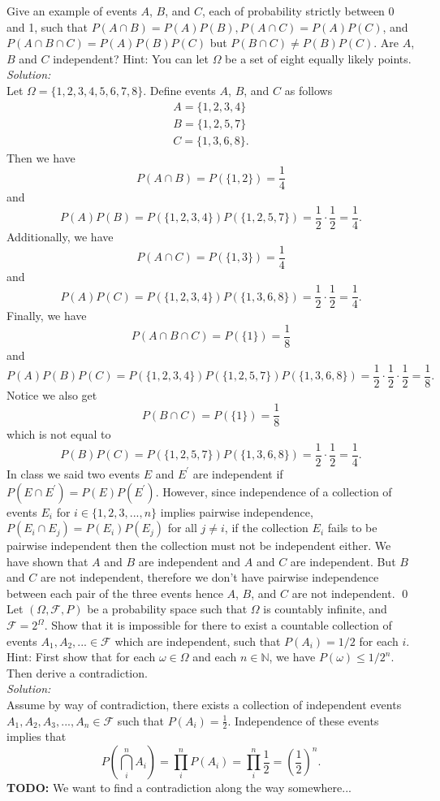 \documentclass[10pt]{amsart}
\begin{document}
 Give an example of events $A$, $B$, and $C$, each of probability strictly between 0 and 1, such that
$P(A\cap B)=P(A)P(B), P(A\cap C)=P(A)P(C)$, and $P(A\cap B\cap C)=P(A)P(B)P(C)$ but $P(B\cap C)\neq P(B)P(C)$. Are $A$, $B$ and $C$ independent? Hint: You can let $\Omega$ be a set of eight equally likely points. \\
\textit{Solution:} \\
Let $\Omega = \{1, 2, 3, 4, 5, 6, 7, 8\}$.
Define events $A$, $B$, and $C$ as follows
\begin{align*}
A = \{1, 2, 3, 4\} \\
B = \{1, 2, 5, 7\} \\
C = \{1, 3, 6, 8\}.
\end{align*}
Then we have 
$$P(A \cap B) = P(\{ 1, 2 \}) = \frac 1 4$$
and
$$P(A)P(B) = P(\{1, 2, 3, 4\})P(\{1, 2, 5, 7\}) =  \frac 1 2 \cdot \frac 1 2 = \frac 1 4.$$
Additionally, we have 
$$P(A \cap C) = P(\{ 1, 3 \}) = \frac 1 4$$
and
$$P(A)P(C) = P(\{1, 2, 3, 4\})P(\{1, 3, 6, 8\}) =  \frac 1 2 \cdot \frac 1 2 = \frac 1 4.$$
Finally, we have 
$$P(A \cap B \cap C) = P(\{ 1\}) = \frac 1 8$$
and
$$P(A)P(B)P(C) = P(\{1, 2, 3, 4\})P(\{1, 2, 5, 7\})P(\{1, 3, 6, 8\}) =  \frac 1 2 \cdot \frac 1 2 \cdot \frac 1 2 = \frac 1 8.$$
Notice we also get
$$P(B \cap C) = P(\{ 1 \}) = \frac 1 8$$
which is not equal to
$$P(B)P(C) = P(\{1, 2, 5, 7\})P(\{1, 3, 6, 8\}) =  \frac 1 2 \cdot \frac 1 2 = \frac 1 4.$$
In class we said two events $E$ and $E^\prime$ are independent if $P(E\cap E^\prime) = P(E)P(E^\prime)$.
However, since independence of a collection of events $E_i$ for $i \in \{1, 2, 3, ..., n\}$ implies pairwise independence, $P(E_i\cap E_j) = P(E_i)P(E_j)$ for all $j \neq i$, if the collection $E_i$ fails to be pairwise independent then the collection must not be independent either.
We have shown that $A$ and $B$ are independent and $A$ and $C$ are independent.
But $B$ and $C$ are not independent, therefore we don't have pairwise independence between each pair of the three events hence $A$, $B$, and $C$ are not independent.
\qed
\\

 Let $(\Omega, \mathcal{F},P)$ be a probability space such that $\Omega$ is countably infinite, and $\mathcal{F}=2^{\Omega}$. Show that it is impossible for there to exist a countable collection of events $A_1, A_2,... \in \mathcal{F}$ which are independent, such that $P(A_i)=1/2$ for each $i$. Hint: First show that for each $\omega \in \Omega$ and each $n\in \mathds{N}$, we have $P({\omega})\leq 1/2^n$. Then derive a contradiction. \\
\textit{Solution:} \\
Assume by way of contradiction, there exists a collection of independent events $A_1, A_2, A_3, ..., A_n \in \mathcal F$ such that $P(A_i) = \frac 1 2$.
Independence of these events implies that
$$
P\left( \bigcap_i^n A_i\right) = \prod_i^n P(A_i) = \prod_i^n \frac 1 2 = \left(\frac 1 2\right)^n.
$$
\textbf{TODO:} We want to find a contradiction along the way somewhere...
\\
\end{document}
